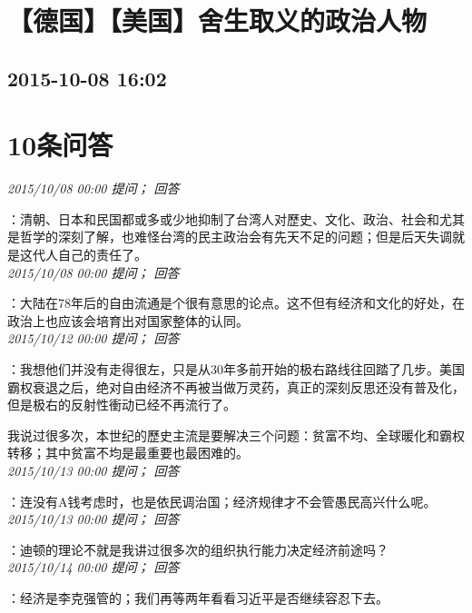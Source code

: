 \documentclass[twocolumn]{ctexart}
\begin{document}
\section{【德国】【美国】舍生取义的政治人物}
\subsection{2015-10-08 16:02}


\section{10条问答}

\textit{\hfill\noindent\small 2015/10/08 00:00 提问； 回答}

：清朝、日本和民国都或多或少地抑制了台湾人对歷史、文化、政治、社会和尤其是哲学的深刻了解，也难怪台湾的民主政治会有先天不足的问题；但是后天失调就是这代人自己的责任了。\\

\textit{\hfill\noindent\small 2015/10/08 00:00 提问； 回答}

：大陆在78年后的自由流通是个很有意思的论点。这不但有经济和文化的好处，在政治上也应该会培育出对国家整体的认同。\\

\textit{\hfill\noindent\small 2015/10/12 00:00 提问； 回答}

：我想他们并没有走得很左，只是从30年多前开始的极右路线往回踏了几步。美国霸权衰退之后，绝对自由经济不再被当做万灵药，真正的深刻反思还没有普及化，但是极右的反射性衝动已经不再流行了。

我说过很多次，本世纪的歷史主流是要解决三个问题：贫富不均、全球暖化和霸权转移；其中贫富不均是最重要也最困难的。\\

\textit{\hfill\noindent\small 2015/10/13 00:00 提问； 回答}

：连没有A钱考虑时，也是依民调治国；经济规律才不会管愚民高兴什么呢。\\

\textit{\hfill\noindent\small 2015/10/13 00:00 提问； 回答}

：迪顿的理论不就是我讲过很多次的组织执行能力决定经济前途吗？\\

\textit{\hfill\noindent\small 2015/10/14 00:00 提问； 回答}

：经济是李克强管的；我们再等两年看看习近平是否继续容忍下去。\\
\end{document}
